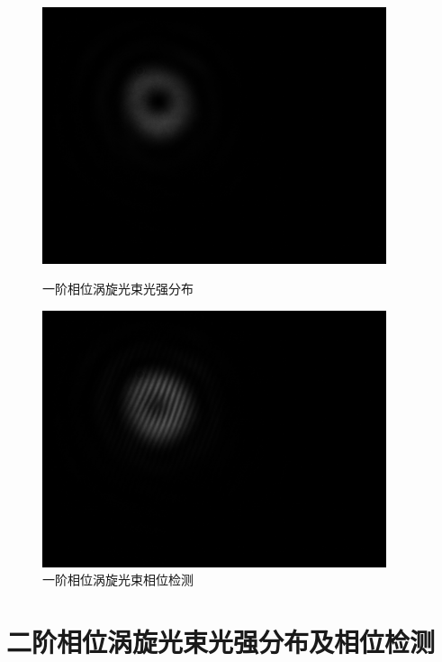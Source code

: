 \documentclass[a4paper,UTF8]{ctexart}
\begin{document}
\begin{figure}[H]
    \centering
    \begin{minipage}[b]{0.45\textwidth}
        \centering
        \includegraphics[width=0.9\textwidth]{./fig/3.png}
        \caption{一阶相位涡旋光束光强分布}
    \end{minipage}
    \begin{minipage}[b]{0.45\textwidth}
        \centering
        \includegraphics[width=0.9\textwidth]{./fig/3_1.png}
        \caption{一阶相位涡旋光束相位检测}
    \end{minipage}
\end{figure}


\section{二阶相位涡旋光束光强分布及相位检测}
\end{document}

